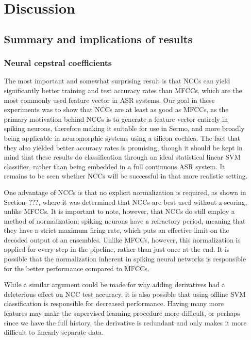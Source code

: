 \chapter{Discussion}

\section{Summary and implications of results}

\subsection{Neural cepstral coefficients}

The most important and somewhat surprising result
is that NCCs can yield significantly
better training and test accuracy rates than MFCCs,
which are the most commonly used
feature vector in ASR systems.
Our goal in these experiments was to
show that NCCs are at least as good as MFCCs,
as the primary motivation behind
NCCs is to generate a feature vector
entirely in spiking neurons,
therefore making it suitable
for use in Sermo,
and more broadly being applicable
in neuromorphic systems using
a silicon cochlea.
The fact that they also yielded
better accuracy rates
is promising,
though it should be kept in mind
that these results
do classification through
an ideal statistical linear SVM classifier,
rather than being embedded
in a full continuous ASR system.
It remains to be seen
whether NCCs will be successful
in that more realistic setting.

One advantage of NCCs is that
no explicit normalization is required,
as shown in Section~???,
where it was determined
that NCCs are best used
without z-scoring, unlike MFCCs.
It is important to note, however,
that NCCs do still employ a method
of normalization;
spiking neurons have a refractory period,
meaning that they have a strict maximum firing rate,
which puts an effective limit on the
decoded output of an ensembles.
Unlike MFCCs, however,
this normalization is applied
for every step in the pipeline,
rather than just once at the end.
It is possible that
the normalization inherent in
spiking neural networks
is responsible for the better performance
compared to MFCCs.

While a similar argument could be made
for why adding derivatives had
a deleterious effect on
NCC test accuracy,
it is also possible that
using offline SVM classification
is responsible for decreased performance.
Having many more features
may make the supervised learning procedure
more difficult,
or perhaps since we have the full history,
the derivative is redundant
and only makes it more difficult
to linearly separate data.

